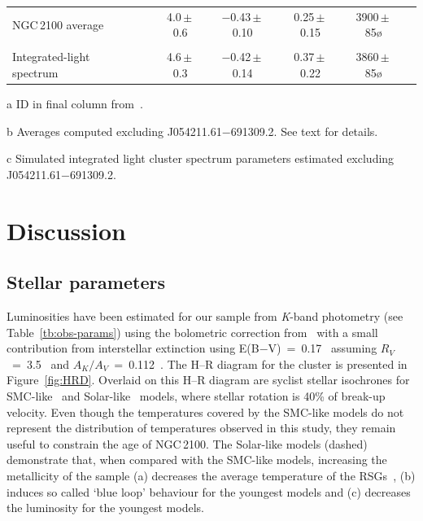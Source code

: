 \begin{table}
\begin{center}
\begin{threeparttable}
\begin{tabular}{lc ccccl}
\\
NGC\,2100 average\tnote{b} & & 4.0\,$\pm$\,0.6 & $-$0.43\,$\pm$\,0.10 & 0.25\,$\pm$\,0.15 & 3900\,$\pm$\,85\o\\
\\
Integrated-light spectrum\tnote{c}             & & 4.6\,$\pm$\,0.3 & $-$0.42\,$\pm$\,0.14 & 0.37\,$\pm$\,0.22 & 3860\,$\pm$\,85\o\\
  \hline
  \end{tabular}
\begin{tablenotes}
    \item [a] ID in final column from{~\cite{1974A&AS...15..261R}}.
    \item [b] Averages computed excluding J054211.61$-$691309.2. See text for details.
    \item [c] Simulated integrated light cluster spectrum parameters estimated excluding J054211.61$-$691309.2.
\end{tablenotes}
  \end{threeparttable}
  \end{center}
\end{table}


\section{Discussion} %
\label{sec:discussion}

\subsection{Stellar parameters} %
\label{sub:stellar_parameters_disc}

Luminosities have been estimated for our sample from {\it K}-band photometry (see Table~\ref{tb:obs-params}) using the bolometric correction from~\cite{2013ApJ...767....3D} with a small contribution from interstellar extinction using E(B$-$V)~=~0.17~\citep{2015A&A...575A..62N} assuming $R_V$~=~3.5~\citep{2013A&A...558A.134D} and $A_K/A_V$~=~0.112~\citep{1985ApJ...288..618R}.
The H--R diagram for the cluster is presented in Figure~\ref{fig:HRD}.
Overlaid on this H--R diagram are {\sc syclist} stellar isochrones for SMC-like~\citep[solid lines;][]{2013A&A...558A.103G} and Solar-like~\citep[dashed lines;][]{2012A&A...537A.146E} models, where stellar rotation is 40\% of break-up velocity.
Even though the temperatures covered by the SMC-like models do not represent the distribution of temperatures observed in this study, they remain useful to constrain the age of NGC\,2100.
The Solar-like models (dashed) demonstrate that, when compared with the SMC-like models, increasing the metallicity of the sample
(a) decreases the average temperature of the RSGs~\citep[something which is not observed by][]{2015ApJ...803...14P},
(b) induces so called `blue loop' behaviour for the youngest models and
(c) decreases the luminosity for the youngest models.

